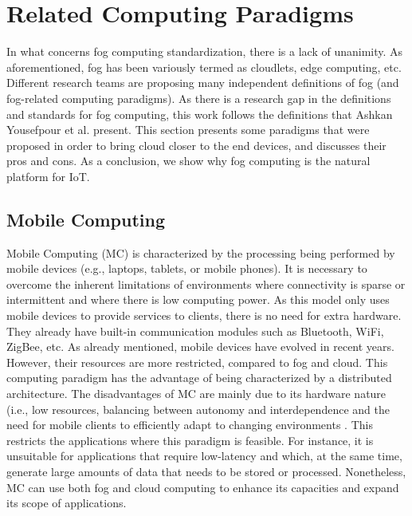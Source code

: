\section{Related Computing Paradigms}
\label{sec:Computingparadigms}
In what concerns fog computing standardization, there is a lack of unanimity. As aforementioned, fog has been variously termed as cloudlets, edge computing, etc. Different research teams are proposing many independent definitions of fog (and fog-related computing paradigms). As there is a research gap in the definitions and standards for fog computing, this work follows the definitions that Ashkan Yousefpour et al. \cite{yousefpour2018all} present. %
This section presents some paradigms that were proposed in order to bring cloud closer to the end devices, and discusses their pros and cons. As a conclusion, we show why fog computing is the natural platform for IoT.

\subsection{Mobile Computing}\label{subsec:MC}
Mobile Computing (MC) is characterized by the processing being performed by mobile devices (e.g., laptops, tablets, or mobile phones). It is necessary to overcome the inherent limitations of environments where connectivity is sparse or intermittent and where there is low computing power. As this model only uses mobile devices to provide services to clients, there is no need for extra hardware. They already have built-in communication modules such as Bluetooth, WiFi, ZigBee, etc. As already mentioned, mobile devices have evolved in recent years. However, their resources are more restricted, compared to fog and cloud.
This computing paradigm has the advantage of being characterized by a distributed architecture. The disadvantages of MC are mainly due to its hardware nature (i.e., low resources, balancing between autonomy and interdependence 
and the need for mobile clients to efficiently adapt to changing environments \cite{satyanarayanan1996fundamental}.
This restricts the applications where this paradigm is feasible. For instance, it is unsuitable for applications that require low-latency and which, at the same time, generate large amounts of data that needs to be stored or processed.
Nonetheless, MC can use both fog and cloud computing to enhance its capacities and expand its scope of applications.

